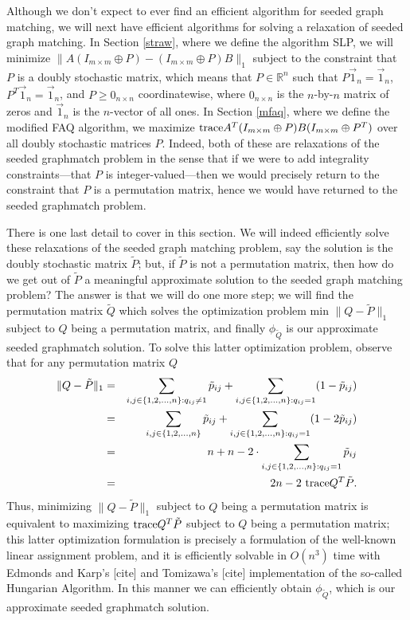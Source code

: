 \documentclass[12pt]{article}
\newcommand{\R}{\mathbb{R}}
\newcommand{\tr}{\textup{trace}}
\begin{document}
Although we don't expect to ever find an efficient
algorithm for seeded graph matching, we will next have efficient
algorithms for solving a relaxation of seeded graph matching.
In Section \ref{straw}, where we define the algorithm SLP,
we will minimize $\|A(I_{m \times m}\oplus P)-(I_{m \times m}\oplus P)B\|_1$
subject to the constraint that $P$ is a doubly stochastic matrix,
which means that $P \in \R^n$ such that $P \vec{1}_n=\vec{1}_n$, $P^T \vec{1}_n=\vec{1}_n$, and $P \geq 0_{n \times n}$ coordinatewise,
where $0_{n \times n}$ is the $n$-by-$n$ matrix of zeros and $\vec{1}_n$ is the $n$-vector of all ones. In Section \ref{mfaq}, where we define the
modified FAQ algorithm,  we maximize
$\tr A^T(I_{m \times m}\oplus P)B(I_{m \times m}\oplus P^T)$
over all doubly stochastic matrices $P$.
Indeed, both of these are relaxations of the seeded graphmatch
problem in the sense that
if we were to add integrality constraints---that $P$ is
integer-valued---then we would precisely return to the constraint
that $P$ is a permutation matrix, hence we would have
returned to the seeded graphmatch problem.


There is one last detail to cover in this section.
We will indeed efficiently solve these relaxations
of the seeded graph matching problem, say the
solution is the doubly stochastic matrix $\tilde{P}$; but, if
$\tilde{P}$ is not a permutation matrix, then how do we get
out of $\tilde{P}$ a meaningful approximate solution to the seeded
graph matching problem? The answer is that we will do one more step;
we will find the permutation matrix $\tilde{Q}$ which solves the
optimization problem min $\| Q - \tilde{P} \|_1$ subject to $Q$ being
a permutation matrix, and finally $\phi_{\tilde{Q}}$ is our approximate
seeded graphmatch solution. To solve this latter
optimization problem, observe that for any permutation matrix $Q$
\begin{eqnarray*}
\|Q - \tilde{P}\|_1 & = & \sum_{i,j \in \{1,2,\ldots,n \}:q_{ij}\ne 1}\tilde{p}_{ij}
+ \sum_{i,j \in \{1,2,\ldots,n \}:q_{ij}=1}(1-\tilde{p}_{ij}) \\  & = &
\sum_{i,j \in \{1,2,\ldots,n \}}\tilde{p}_{ij} +
 \sum_{i,j \in \{1,2,\ldots,n \}:q_{ij}=1}(1-2\tilde{p}_{ij}) \\
 & = & n+ n -2 \cdot \sum_{i,j \in \{1,2,\ldots,n \}:q_{ij}=1}\tilde{p}_{ij}\\
 & = & 2n -2 \ \tr Q^T \tilde{P} .
 \end{eqnarray*}
 Thus,  minimizing $\| Q - \tilde{P} \|_1$ subject to $Q$ being a permutation
matrix is equivalent to maximizing $\tr Q^T \tilde{P}$ subject to $Q$ being
a permutation matrix; this latter optimization formulation is precisely
a formulation of the well-known linear assignment problem, and it
is efficiently solvable in $O(n^3)$ time with Edmonds and Karp's [cite]
and Tomizawa's [cite] implementation
of the so-called Hungarian Algorithm.
In this manner we can efficiently obtain
$\phi_{\tilde{Q}}$, which is our approximate seeded graphmatch solution.
\end{document}
